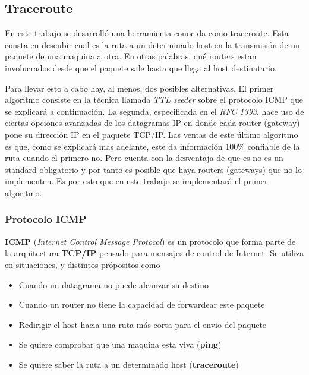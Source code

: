 \subsection{Traceroute}

En este trabajo se desarrolló una herramienta conocida como traceroute. Esta
consta en descubir cual es la ruta a un determinado host en la transmisión 
de un paquete de una maquina a otra. En otras palabras, qué routers estan
involucrados desde que el paquete sale hasta que llega al host destinatario.

Para llevar esto a cabo hay, al menos, dos posibles alternativas. El primer
algoritmo consiste en la técnica llamada \emph{TTL seeder} sobre el protocolo
ICMP que se explicará a continuación. La segunda, especificada en el \emph{RFC
1393}, hace uso de ciertas opciones avanzadas de los datagramas IP en donde
cada router (gateway) pone su dirección IP en el paquete TCP/IP. Las ventas de este último
algoritmo es que, como se explicará mas adelante, este da información 100\%
confiable de la ruta cuando el primero no. Pero cuenta con la desventaja
de que es no es un standard obligatorio y por tanto es posible que haya
routers (gateways) que no lo implementen. Es por esto que en este trabajo se implementará
el primer algoritmo.

\subsubsection{Protocolo \textbf{ICMP}}

\textbf{ICMP} (\emph{Internet Control Message Protocol}) es un protocolo que
forma parte de la arquitectura \textbf{TCP/IP} pensado para mensajes de control
de Internet. Se utiliza en situaciones, y distintos própositos como

\begin{itemize}
	\item Cuando un datagrama no puede alcanzar su destino
	\item Cuando un router no tiene la capacidad de forwardear este paquete
	\item Redirigir el host hacia una ruta más corta para el envio del paquete
	\item Se quiere comprobar que una maquína esta viva (\textbf{ping})
	\item Se quiere saber la ruta a un determinado host (\textbf{traceroute})
\end{itemize}
